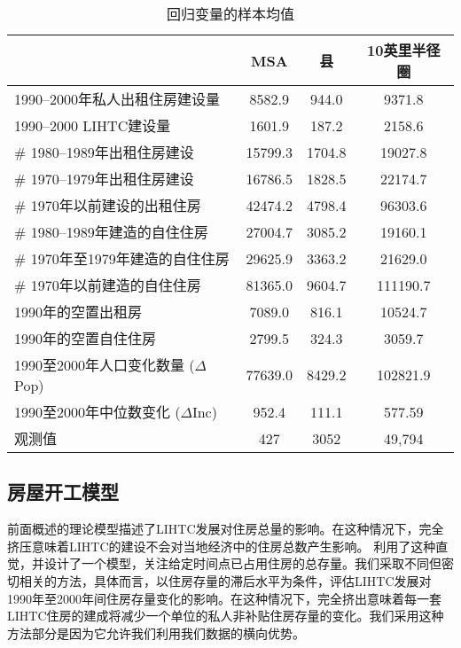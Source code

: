 \documentclass[lang=cn,11pt,a4paper]{paper}
\begin{document}
\begin{table}[h]
  \centering
  \setlength{\tabcolsep}{5mm}
    \caption{回归变量的样本均值}\label{tab3}
      \begin{tabular}{lccc}
        \toprule
        & \textbf{MSA} & \textbf{县} & \textbf{10英里半径圈} \\
        \midrule
        1990--2000年私人出租住房建设量 & 8582.9 & 944.0 &
        9371.8 \\
        1990--2000 LIHTC建设量  & 1601.9 & 187.2 & 2158.6 \\
        \# 1980--1989年出租住房建设 & 15799.3 & 1704.8 &
        19027.8 \\
        \# 1970--1979年出租住房建设 & 16786.5 & 1828.5 &
        22174.7 \\
        \# 1970年以前建设的出租住房 & 42474.2 & 4798.4 &
        96303.6 \\
        \# 1980--1989年建造的自住住房 & 27004.7 & 3085.2 &
        19160.1 \\
        \# 1970年至1979年建造的自住住房 & 29625.9 & 3363.2 &
        21629.0 \\
        \# 1970年以前建造的自住住房 & 81365.0 & 9604.7
        & 111190.7 \\
        1990年的空置出租房 & 7089.0 & 816.1 & 10524.7 \\
        1990年的空置自住住房 & 2799.5 & 324.3 &
        3059.7 \\
        1990至2000年人口变化数量 ($\Delta$Pop) & 77639.0 & 8429.2 &
        102821.9 \\
        1990至2000年中位数变化 ($\Delta$Inc) & 952.4 & 111.1 &
        577.59 \\
        观测值 & 427 & 3052 & 49,794 \\
        \bottomrule
      \end{tabular}
  \end{table}

\subsection{房屋开工模型}

前面概述的理论模型描述了LIHTC发展对住房总量的影响。在这种情况下，完全挤压意味着LIHTC的建设不会对当地经济中的住房总数产生影响。\cite{Sinai20052137} 利用了这种直觉，并设计了一个模型，关注给定时间点已占用住房的总存量。我们采取不同但密切相关的方法，具体而言，以住房存量的滞后水平为条件，评估LIHTC发展对1990年至2000年间住房存量变化的影响。在这种情况下，完全挤出意味着每一套LIHTC住房的建成将减少一个单位的私人非补贴住房存量的变化。我们采用这种方法部分是因为它允许我们利用我们数据的横向优势。
\end{document}

